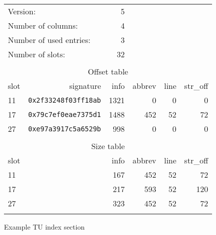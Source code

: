 \begin{figure}[h]
\bb
\begin{center}
\begin{tabular}{lrrrrr}
\hline
  \multicolumn{2}{l}{Version:}&                 5 \\
  \multicolumn{2}{l}{Number of columns:}&       4 \\
  \multicolumn{2}{l}{Number of used entries:}&  3 \\
  \multicolumn{2}{l}{Number of slots:}&         32 \\
\\
  \multicolumn{6}{c}{Offset table} \\
  \hline
  slot&  signature&                    info&   abbrev&     line& str\_off \\
  11& \texttt{0x2f33248f03ff18ab}&     1321&        0&        0&        0 \\
  17& \texttt{0x79c7ef0eae7375d1}&     1488&      452&       52&       72 \\
  27& \texttt{0xe97a3917c5a6529b}&      998&        0&        0&        0 \\
\\
  \multicolumn{6}{c}{Size table} \\
  \hline
  slot&                          &     info&   abbrev&     line& str\_off \\
  11&                            &     167&      452&       52&       72 \\
  17&                            &     217&      593&       52&      120 \\
  27&                            &     323&      452&       52&       72 \\
\\
\hline
\end{tabular}
\end{center}
\caption{Example TU index section}
\label{fig:exampletuindexsection}
\eb
\end{figure}

